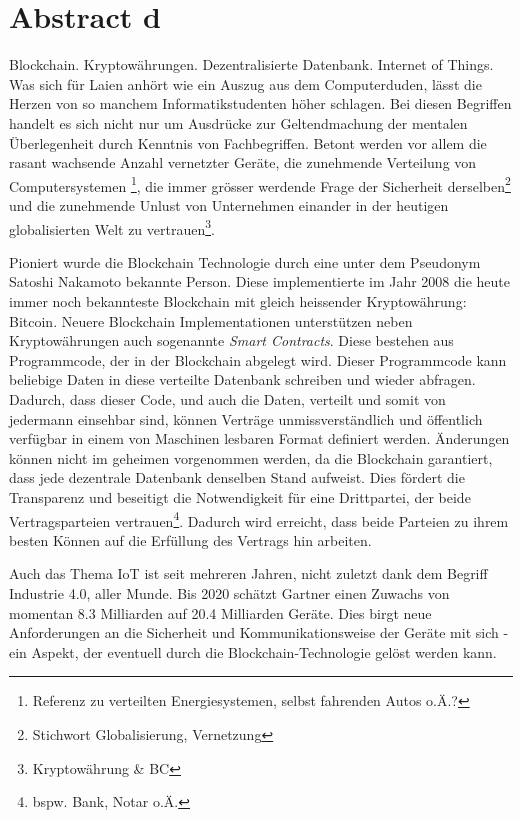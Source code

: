 \chapter{Abstract d}
\label{cha:abstract_d}
Blockchain. Kryptowährungen. Dezentralisierte Datenbank. Internet of Things. Was sich für Laien anhört wie ein Auszug aus dem Computerduden, lässt die Herzen von so manchem Informatikstudenten höher schlagen. Bei diesen Begriffen handelt es sich nicht nur um Ausdrücke zur Geltendmachung der mentalen Überlegenheit durch Kenntnis von Fachbegriffen. Betont werden vor allem die rasant wachsende Anzahl vernetzter Geräte, die zunehmende Verteilung von Computersystemen \footnote{Referenz zu verteilten Energiesystemen, selbst fahrenden Autos o.Ä.?}, die immer grösser werdende Frage der Sicherheit derselben\footnote{Stichwort Globalisierung, Vernetzung} und die zunehmende Unlust von Unternehmen einander in der heutigen globalisierten Welt zu vertrauen\footnote{Kryptowährung \& BC}.

Pioniert wurde die Blockchain Technologie durch eine unter dem Pseudonym Satoshi Nakamoto bekannte Person. Diese implementierte im Jahr 2008 die heute immer noch bekannteste Blockchain mit gleich heissender Kryptowährung: Bitcoin. Neuere Blockchain Implementationen unterstützen neben Kryptowährungen auch sogenannte \emph{Smart Contracts}. Diese bestehen aus Programmcode, der in der Blockchain abgelegt wird. Dieser Programmcode kann beliebige Daten in diese verteilte Datenbank schreiben und wieder abfragen. Dadurch, dass dieser Code, und auch die Daten, verteilt und somit von jedermann einsehbar sind, können Verträge unmissverständlich und öffentlich verfügbar in einem von Maschinen lesbaren Format definiert werden. Änderungen können nicht im geheimen vorgenommen werden, da die Blockchain garantiert, dass jede dezentrale Datenbank denselben Stand aufweist. Dies fördert die Transparenz und beseitigt die Notwendigkeit für eine Drittpartei, der beide Vertragsparteien vertrauen\footnote{bspw. Bank, Notar o.Ä.}. Dadurch wird erreicht, dass beide Parteien zu ihrem besten Können auf die Erfüllung des Vertrags hin arbeiten.

Auch das Thema \acrshort{IoT} ist seit mehreren Jahren, nicht zuletzt dank dem Begriff Industrie 4.0, aller Munde. Bis 2020 schätzt Gartner einen Zuwachs von momentan 8.3 Milliarden auf 20.4 Milliarden Geräte. Dies birgt neue Anforderungen an die Sicherheit und Kommunikationsweise der Geräte mit sich - ein Aspekt, der eventuell durch die Blockchain-Technologie gelöst werden kann.\cite{gartner.com_iot,BlockchainRevolution}

